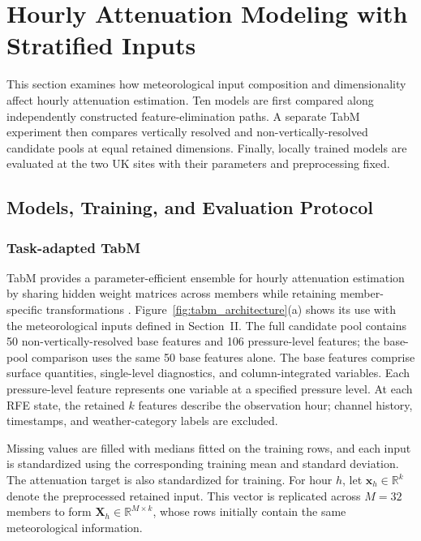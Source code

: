 \section{Hourly Attenuation Modeling with Stratified Inputs}
\label{sec:hourly_modeling}

This section examines how meteorological input composition and dimensionality affect hourly attenuation estimation. Ten models are first compared along independently constructed feature-elimination paths. A separate TabM experiment then compares vertically resolved and non-vertically-resolved candidate pools at equal retained dimensions. Finally, locally trained models are evaluated at the two UK sites with their parameters and preprocessing fixed.

\subsection{Models, Training, and Evaluation Protocol}
\label{subsec:hourly_protocol}

\subsubsection{Task-adapted TabM}

TabM provides a parameter-efficient ensemble for hourly attenuation estimation by sharing hidden weight matrices across members while retaining member-specific transformations \cite{Gorishniy2025TabM}. Figure~\ref{fig:tabm_architecture}(a) shows its use with the meteorological inputs defined in Section~II. The full candidate pool contains 50 non-vertically-resolved base features and 106 pressure-level features; the base-pool comparison uses the same 50 base features alone. The base features comprise surface quantities, single-level diagnostics, and column-integrated variables. Each pressure-level feature represents one variable at a specified pressure level. At each RFE state, the retained $k$ features describe the observation hour; channel history, timestamps, and weather-category labels are excluded.

Missing values are filled with medians fitted on the training rows, and each input is standardized using the corresponding training mean and standard deviation. The attenuation target is also standardized for training. For hour $h$, let $\mathbf{x}_h\in\mathbb{R}^{k}$ denote the preprocessed retained input. This vector is replicated across $M=32$ members to form $\mathbf{X}_h\in\mathbb{R}^{M\times k}$, whose rows initially contain the same meteorological information.

